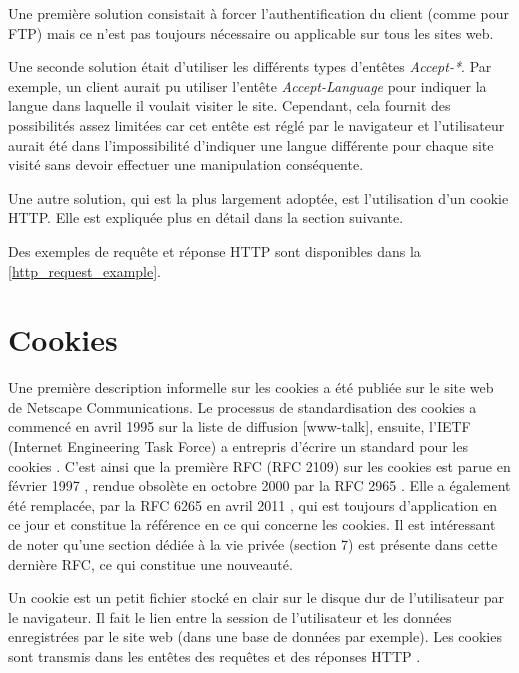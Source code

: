 Une première solution consistait à forcer l'authentification du client (comme pour FTP) mais ce n'est pas toujours nécessaire ou applicable sur tous les sites web.

Une seconde solution était d'utiliser les différents types d'entêtes \emph{Accept-*}. Par exemple, un client aurait pu utiliser l'entête \emph{Accept-Language} pour indiquer la langue dans laquelle il voulait visiter le site. Cependant, cela fournit des possibilités assez limitées car cet entête est réglé par le navigateur et l'utilisateur aurait été dans l'impossibilité d'indiquer une langue différente pour chaque site visité sans devoir effectuer une manipulation conséquente.

Une autre solution, qui est la plus largement adoptée, est l'utilisation d'un cookie HTTP. Elle est expliquée plus en détail dans la section suivante.

Des exemples de requête et réponse HTTP sont disponibles dans la \autoref{http_request_example}.


\section{Cookies}
Une première description informelle sur les cookies a été publiée sur le site web de Netscape Communications. Le processus de standardisation des cookies a commencé en avril 1995 sur la liste de diffusion [www-talk], ensuite, l'IETF (Internet Engineering Task Force) a entrepris d'écrire un standard pour les cookies \cite{Kristol:2001:HCS:502152.502153}. C'est ainsi que la première RFC (RFC 2109) sur les cookies est parue en février 1997 \cite{IETF_RFC2109}, rendue obsolète en octobre 2000 par la RFC 2965 \cite{IETF_RFC2965}. Elle a également été remplacée, par la RFC 6265 en avril 2011 \cite{IETF_RFC6265}, qui est toujours d'application en ce jour et constitue la référence en ce qui concerne les cookies. Il est intéressant de noter qu'une section dédiée à la vie privée (section 7) est présente dans cette dernière RFC, ce qui constitue une nouveauté.
\newline

Un cookie est un petit fichier stocké en clair sur le disque dur de l'utilisateur par le navigateur. Il fait le lien entre la session de l'utilisateur et les données enregistrées par le site web (dans une base de données par exemple). Les cookies sont transmis dans les entêtes des requêtes et des réponses HTTP \cite{IETF_RFC6265}.

